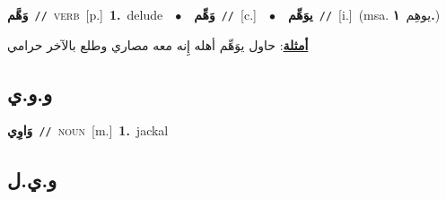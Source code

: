 \documentclass[10pt,a4paper,twoside]{article} %
\begin{document}
\begin{multicols}{2}
{\setlength\topsep{0pt}\textbf{\foreignlanguage{arabic}{وَهَّم}}\ {\color{gray}\texttt{//}\color{black}}\ \textsc{verb}\ [p.]\ \textbf{1.}~delude\ \ $\bullet$\ \ \setlength\topsep{0pt}\textbf{\foreignlanguage{arabic}{وَهِّم}}\ {\color{gray}\texttt{//}\color{black}}\ [c.]\ \ $\bullet$\ \ \setlength\topsep{0pt}\textbf{\foreignlanguage{arabic}{يوَهِّم}}\ {\color{gray}\texttt{//}\color{black}}\ [i.]\ \color{gray}(msa. \foreignlanguage{arabic}{يوهِم}~\foreignlanguage{arabic}{\textbf{١.}})\color{black}\  \begin{flushright}\color{gray}\foreignlanguage{arabic}{\textbf{\underline{\foreignlanguage{arabic}{أمثلة}}}: حاول يوَهِّم أهله إِنه معه مصاري وطلع بالآخر حرامي}\end{flushright}\color{black}} \vspace{2mm}

\vspace{-3mm}
\subsection*{\color{blue}\foreignlanguage{arabic}{و.و.ي}\color{blue}{ (ntws)}} 

{\setlength\topsep{0pt}\textbf{\foreignlanguage{arabic}{وَاوِي}}\ {\color{gray}\texttt{//}\color{black}}\ \textsc{noun}\ [m.]\ \textbf{1.}~jackal\ } \vspace{2mm}

\vspace{-3mm}
\subsection*{\color{blue}\foreignlanguage{arabic}{و.ي.ل}\color{blue}{}} 


\end{multicols}
\end{document}
